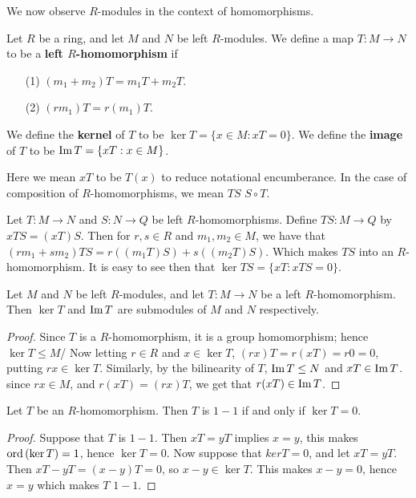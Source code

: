 We now observe $R$-modules in the context of homomorphisms.

\begin{definition}
    Let $R$ be a ring, and let  $M$ and  $N$ be  left $R$-modules. We define a map  $T:M \rightarrow
    N$to be a \textbf{left $R$-homomorphism} if
        \begin{enumerate}
            \item[(1)] $(m_1+m_2)T=m_1T+m_2T$.

            \item[(2)] $(rm_1)T=r(m_1)T$.
        \end{enumerate}
    We define the \textbf{kernel} of $T$ to be  $\ker{T}=\{x \in M: xT=0\}$. We define the
    \textbf{image} of $T$ to be  $\operatorname{Im}{T}=\{xT: x \in M\}$.
\end{definition}

Here we mean $xT$ to be  $T(x)$ to reduce notational encumberance. In the case of composition of
$R$-homomorphisms, we mean  $TS$  $S \circ T$.

\begin{example}
    Let $T:M \rightarrow N$ and $S:N \rightarrow Q$ be left $R$-homomorphisms. Define  $TS:M
    \rightarrow Q$ by $xTS=(xT)S$. Then for $r, s \in R$ and  $m_1, m_2 \in M$, we have that
    $(rm_1+sm_2)TS=r((m_1T)S)+s((m_2T)S)$. Which makes $TS$ into an $R$-homomorphism. It is easy to
    see then that  $\ker{TS}=\{xT:xTS=0\}$.
\end{example} 

\begin{lemma}\label{1.5.3}
    Let $M$ and  $N$ be left  $R$-modules, and let  $T:M \rightarrow N$ be a left $R$-homomorphism.
    Then  $\ker{T}$ and $\operatorname{Im}{T}$ are submodules of $M$ and  $N$ respectively.
\end{lemma}
\begin{proof}
    Since $T$ is a  $R$-homomorphism, it is a group homomorphism; hence  $\ker{T} \leq M$/ Now
    letting $r \in R$ and  $x \in \ker{T}$, $(rx)T=r(xT)=r0=0$, putting $rx \in \ker{T}$. 
    Similarly, by the bilinearity of $T$,  $\operatorname{Im}{T} \leq N$ and $xT \in \operatorname{Im}{T}$. since $rx \in M$,  
    and $r(xT)=(rx)T$, we get that $r(xT) \in \operatorname{Im}{T}$.
\end{proof}

\begin{lemma}\label{1.5.4}
    Let $T$ be an $R$-homomorphism. Then  $T$ is  $1-1$ if and only if  $\ker{T}=0$.
\end{lemma}
\begin{proof}
    Suppose that $T$ is  $1-1$. Then  $xT=yT$ implies  $x=y$, this makes  $\operatorname{ord}{(\ker{T})}=1$, hence
    $\ker{T}=0$. Now suppose that $ker{T}=0$, and let $xT=yT$. Then  $xT-yT=(x-y)T=0$, so $x-y \in
    \ker{T}$. This makes $x-y=0$, hence  $x=y$ which makes  $T$  $1-1$.
\end{proof}

